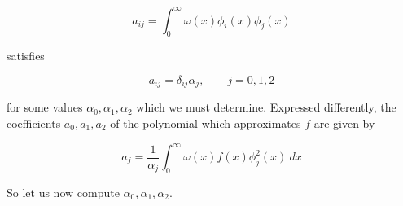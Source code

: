 \documentclass[12pt]{article}
\theoremstyle{definition}
\begin{document}
\begin{equation*}
    a_{ij} = \int_0^\infty \omega(x) \phi_i(x) \phi_j(x)
\end{equation*}

satisfies 

\begin{equation*}
    a_{ij} = \delta_{ij} \alpha_j, \qquad j =0, 1, 2
\end{equation*}

for some values $\alpha_0, \alpha_1, \alpha_2$ which we must determine.
Expressed differently, the coefficients $a_0, a_1, a_2$ of the polynomial which
approximates $f$ are given by 

\begin{equation*}
    a_j = \frac{1}{\alpha_j} \int_0^\infty \omega(x) f(x) \phi_j^2(x) ~ dx
\end{equation*}

So let us now compute $\alpha_0, \alpha_1, \alpha_2$.
\end{document}

